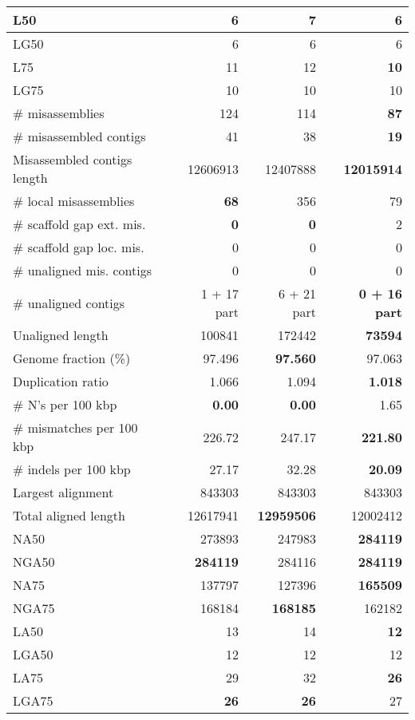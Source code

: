 \documentclass[12pt,a4paper]{article}
\begin{document}
\begin{table}[ht]
\begin{center}
\begin{tabular}{|l*{3}{|r}|}
L50 & {\bf 6} & 7 & {\bf 6} \\ \hline
LG50 & 6 & 6 & 6 \\ \hline
L75 & 11 & 12 & {\bf 10} \\ \hline
LG75 & 10 & 10 & 10 \\ \hline
\# misassemblies & 124 & 114 & {\bf 87} \\ \hline
\# misassembled contigs & 41 & 38 & {\bf 19} \\ \hline
Misassembled contigs length & 12606913 & 12407888 & {\bf 12015914} \\ \hline
\# local misassemblies & {\bf 68} & 356 & 79 \\ \hline
\# scaffold gap ext. mis. & {\bf 0} & {\bf 0} & 2 \\ \hline
\# scaffold gap loc. mis. & 0 & 0 & 0 \\ \hline
\# unaligned mis. contigs & 0 & 0 & 0 \\ \hline
\# unaligned contigs & 1 + 17 part & 6 + 21 part & {\bf 0 + 16 part} \\ \hline
Unaligned length & 100841 & 172442 & {\bf 73594} \\ \hline
Genome fraction (\%) & 97.496 & {\bf 97.560} & 97.063 \\ \hline
Duplication ratio & 1.066 & 1.094 & {\bf 1.018} \\ \hline
\# N's per 100 kbp & {\bf 0.00} & {\bf 0.00} & 1.65 \\ \hline
\# mismatches per 100 kbp & 226.72 & 247.17 & {\bf 221.80} \\ \hline
\# indels per 100 kbp & 27.17 & 32.28 & {\bf 20.09} \\ \hline
Largest alignment & 843303 & 843303 & 843303 \\ \hline
Total aligned length & 12617941 & {\bf 12959506} & 12002412 \\ \hline
NA50 & 273893 & 247983 & {\bf 284119} \\ \hline
NGA50 & {\bf 284119} & 284116 & {\bf 284119} \\ \hline
NA75 & 137797 & 127396 & {\bf 165509} \\ \hline
NGA75 & 168184 & {\bf 168185} & 162182 \\ \hline
LA50 & 13 & 14 & {\bf 12} \\ \hline
LGA50 & 12 & 12 & 12 \\ \hline
LA75 & 29 & 32 & {\bf 26} \\ \hline
LGA75 & {\bf 26} & {\bf 26} & 27 \\ \hline
\end{tabular}
\end{center}
\end{table}
\end{document}

